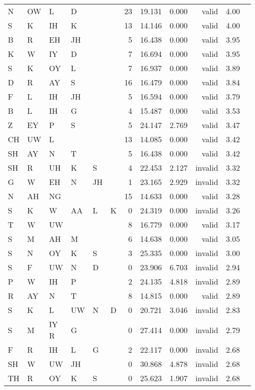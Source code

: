 \begin{longtable}{l@{ } l@{ } l@{ } l@{ } l@{ } l r r r r r r}
N & OW & L & D &   &   & 23 & 19.131 & 0.000 & valid & 4.00 \\
S & K & IH & K &   &   & 13 & 14.146 & 0.000 & valid & 4.00 \\
B & R & EH & JH &   &   & 5 & 16.438 & 0.000 & valid & 3.95 \\
K & W & IY & D &   &   & 7 & 16.694 & 0.000 & valid & 3.95 \\
S & K & OY & L &   &   & 7 & 16.937 & 0.000 & valid & 3.89 \\
D & R & AY & S &   &   & 16 & 16.479 & 0.000 & valid & 3.84 \\
F & L & IH & JH &   &   & 5 & 16.594 & 0.000 & valid & 3.79 \\
B & L & IH & G &   &   & 4 & 15.487 & 0.000 & valid & 3.53 \\
Z & EY & P & S &   &   & 5 & 24.147 & 2.769 & valid & 3.47 \\
CH & UW & L &   &   &   & 13 & 14.085 & 0.000 & valid & 3.42 \\
SH & AY & N & T &   &   & 5 & 16.438 & 0.000 & valid & 3.42 \\
SH & R & UH & K & S &   & 4 & 22.453 & 2.127 & invalid & 3.32 \\
G & W & EH & N & JH &   & 1 & 23.165 & 2.929 & invalid & 3.32 \\
N & AH & NG &   &   &   & 15 & 14.633 & 0.000 & valid & 3.28 \\
S & K & W & AA & L & K & 0 & 24.319 & 0.000 & invalid & 3.26 \\
T & W & UW &   &   &   & 8 & 16.779 & 0.000 & valid & 3.17 \\
S & M & AH & M &   &   & 6 & 14.638 & 0.000 & valid & 3.05 \\
S & N & OY & K & S &   & 3 & 25.335 & 0.000 & invalid & 3.00 \\
S & F & UW & N & D &   & 0 & 23.906 & 6.703 & invalid & 2.94 \\
P & W & IH & P &   &   & 2 & 24.135 & 4.818 & invalid & 2.89 \\
R & AY & N & T &   &   & 8 & 14.815 & 0.000 & valid & 2.89 \\
S & K & L & UW & N & D & 0 & 20.721 & 3.046 & invalid & 2.83 \\
S & M & IY R & G &   &   & 0 & 27.414 & 0.000 & invalid & 2.79 \\
F & R & IH & L & G &   & 2 & 22.117 & 0.000 & invalid & 2.68 \\
SH & W & UW & JH &   &   & 0 & 30.868 & 4.878 & invalid & 2.68 \\
TH & R & OY & K & S &   & 0 & 25.623 & 1.907 & invalid & 2.68 \\

\end{longtable}
